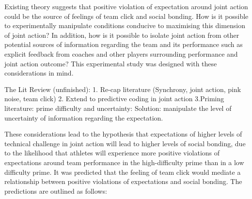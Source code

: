 Existing theory suggests that positive violation of expectation around joint action could be the source of feelings of team click and social bonding. How is it possible to experimentally manipulate conditions conducive to maximising this dimension of joint action? In addition, how is it possible to isolate joint action from other potential sources of information regarding the team and its performance such as explicit feedback from coaches and other players surrounding performance and joint action outcome? This experimental study was designed with these considerations in mind.



The Lit Review (unfinished):
1. Re-cap literature (Synchrony, joint action, pink noise, team click)
2. Extend to predictive coding in joint action
3.Priming literature: prime difficulty and uncertainty:
Solution: manipulate the level of uncertainty of information regarding the expectation.





These considerations lead to the hypothesis that expectations of higher levels of technical challenge in joint action will lead to higher levels of social bonding, due to the likelihood that athletes will experience more positive violations of expectations around team performance in the high-difficulty prime than in a low difficulty prime. It was predicted that the feeling of team click would mediate a relationship between positive violations of expectations and social bonding.  The predictions are outlined as follows:


